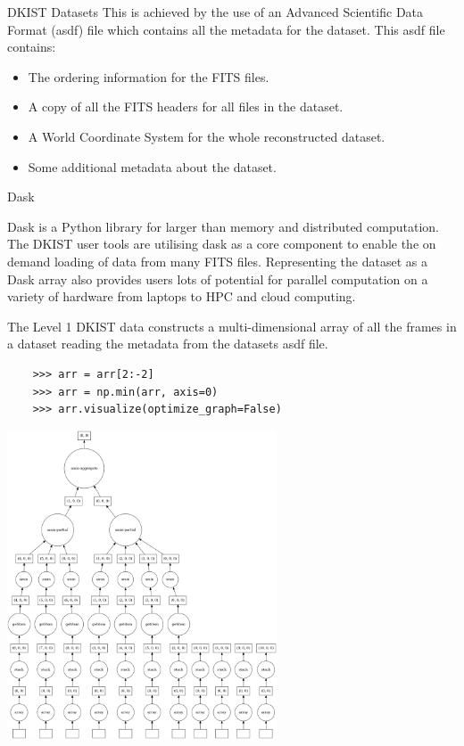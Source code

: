 \documentclass[landscape,a0paper,fontscale=0.32]{baposter}
\begin{document}
\begin{poster}
\begin{posterbox}[name=dataset,column=0,row=0,span=1,below=intro]{DKIST Datasets}
  This is achieved by the use of an Advanced Scientific Data Format (asdf) file
  which contains all the metadata for the dataset. This asdf file contains:
  \begin{itemize}
    \item The ordering information for the FITS files.
    \item A copy of all the FITS headers for all files in the dataset.
    \item A World Coordinate System for the whole reconstructed dataset.
    \item Some additional metadata about the dataset.
  \end{itemize}
  
\end{posterbox}

\begin{posterbox}[name=dask,column=1,row=0,span=1,below=intro]{Dask}
  
  Dask is a Python library for larger than memory and distributed computation.
  The DKIST user tools are utilising dask as a core component to enable the on
  demand loading of data from many FITS files. Representing the dataset as a Dask
  array also provides users lots of potential for parallel computation on a
  variety of hardware from laptops to HPC and cloud computing.

  The Level 1 DKIST data constructs a multi-dimensional array of all the frames
  in a dataset reading the metadata from the datasets asdf file.
  
  \begin{verbatim}
    >>> arr = arr[2:-2]
    >>> arr = np.min(arr, axis=0)
    >>> arr.visualize(optimize_graph=False)
  \end{verbatim}

  \begin{center}
    \includegraphics[width=0.6\textwidth]{mydask.png}
  \end{center}


\end{posterbox}
\end{poster}
\end{document}
